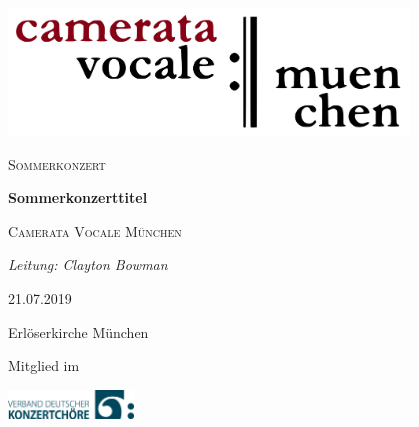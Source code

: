 \documentclass[11pt, ngermanm, titlepage]{article}
\begin{document}
	\begin{titlepage}
	\centering
	\includegraphics[width=0.8\textwidth]{img/cvlogo.png}\par\vspace{2cm}
	
	{\scshape\Large Sommerkonzert\par}
	\vspace{1.5cm}
	{\fontsize{50}{60}\bfseries\jubilo Sommerkonzerttitel\par}
	\vspace{1.5cm}
	{\scshape\LARGE Camerata Vocale München\par}
	\vspace{1cm}
	{\Large\itshape Leitung: Clayton Bowman\par}
	\vfill
	21.07.2019\par
	Erlöserkirche München
	
	\vfill
	
	{\scriptsize Mitglied im\par}
	\includegraphics[width=0.25\textwidth]{img/vdkc_logo_klein.jpg}\par\vspace{2cm}


	\end{titlepage}

	\pagebreak

	
\end{document}
